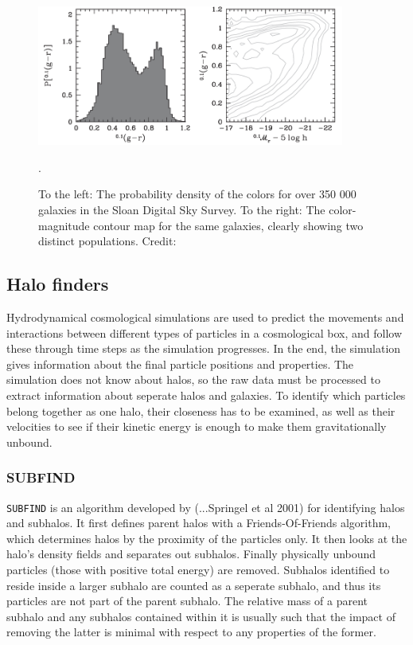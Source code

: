 \begin{figure}
    \centering
    \includegraphics[width=0.9\textwidth]{images/color_bimodality.png}
    \caption{To the left: The probability density of the colors for over 350 000 galaxies in the Sloan Digital Sky Survey. To the right: The color-magnitude contour map for the same galaxies, clearly showing two distinct populations. Credit: \textcite{Mo2010}}.
    \label{color_bimodality}
\end{figure}

\subsection{Halo finders}

Hydrodynamical cosmological simulations are used to predict the movements and interactions between different types of particles in a cosmological box, and follow these through time steps as the simulation progresses. In the end, the simulation gives information about the final particle positions and properties. The simulation does not know about halos, so the raw data must be processed to extract information about seperate halos and galaxies. To identify which particles belong together as one halo, their closeness has to be examined, as well as their velocities to see if their kinetic energy is enough to make them gravitationally unbound.

\subsubsection{SUBFIND}
\texttt{SUBFIND} is an algorithm developed by (...Springel et al 2001) for identifying halos and subhalos. It first defines parent halos with a Friends-Of-Friends algorithm, which determines halos by the proximity of the particles only. It then looks at the halo's density fields and separates out subhalos. Finally physically unbound particles (those with positive total energy) are removed. Subhalos identified to reside inside a larger subhalo are counted as a seperate subhalo, and thus its particles are not part of the parent subhalo. The relative mass of a parent subhalo and any subhalos contained within it is usually such that the impact of removing the latter is minimal with respect to any properties of the former.